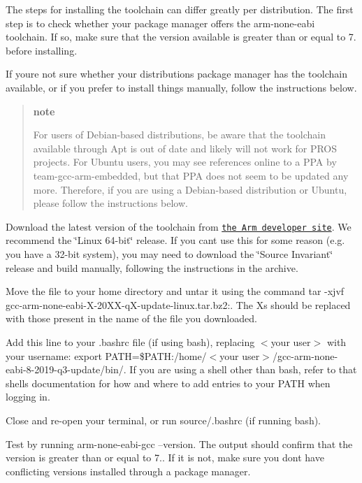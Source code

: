 The steps for installing the toolchain can differ greatly per distribution. The first step is to check whether your package manager offers the arm-\/none-\/eabi toolchain. If so, make sure that the version available is greater than or equal to 7. before installing.

If you\textquotesingle{}re not sure whether your distribution\textquotesingle{}s package manager has the toolchain available, or if you prefer to install things manually, follow the instructions below.

\begin{quote}
{\bfseries note}

For users of Debian-\/based distributions, be aware that the toolchain available through Apt is out of date and likely will not work for P\+R\+OS projects. For Ubuntu users, you may see references online to a P\+PA by team-\/gcc-\/arm-\/embedded, but that P\+PA does not seem to be updated any more. Therefore, if you are using a Debian-\/based distribution or Ubuntu, please follow the instructions below. \end{quote}



\begin{DoxyEnumerate}
\item Download the latest version of the toolchain from \href{https://developer.arm.com/tools-and-software/open-source-software/developer-tools/gnu-toolchain/gnu-rm/downloads}{\tt the Arm developer site}. We recommend the \char`\"{}\+Linux 64-\/bit\char`\"{} release. If you can\textquotesingle{}t use this for some reason (e.\+g. you have a 32-\/bit system), you may need to download the \char`\"{}\+Source Invariant\char`\"{} release and build manually, following the instructions in the archive.
\item Move the file to your home directory and untar it using the command tar -\/xjvf gcc-\/arm-\/none-\/eabi-\/\+X-\/20\+X\+X-\/q\+X-\/update-\/linux.\+tar.\+bz2\+:. The Xs should be replaced with those present in the name of the file you downloaded.
\item Add this line to your .bashrc file (if using bash), replacing $<$your user$>$ with your username\+: export P\+A\+TH=\$P\+A\+TH\+:/home/$<$your user$>$/gcc-\/arm-\/none-\/eabi-\/8-\/2019-\/q3-\/update/bin/. If you are using a shell other than bash, refer to that shell\textquotesingle{}s documentation for how and where to add entries to your P\+A\+TH when logging in.
\item Close and re-\/open your terminal, or run source/.bashrc (if running bash).
\item Test by running arm-\/none-\/eabi-\/gcc --version. The output should confirm that the version is greater than or equal to 7.. If it is not, make sure you don\textquotesingle{}t have conflicting versions installed through a package manager.
\end{DoxyEnumerate}

